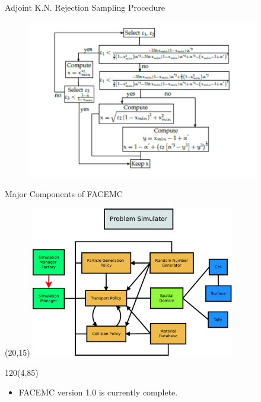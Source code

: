 \documentclass{beamer}
\begin{document}
\appendix
\begin{frame}{Adjoint K.N. Rejection Sampling Procedure}

  \begin{figure}[h!]
     \begin{center}
       \includegraphics[width=4in]{figures/adjoint_KN_rejection_sampling_proc.pdf}
     \end{center}
   \end{figure}

\end{frame}

\begin{frame}{Major Components of FACEMC}
  
  \begin{textblock}{20}(20,15)
    \includegraphics[width=3.5in]{../document/chapters/code_overview/Problem_Simulator.pdf}
  \end{textblock}

  \begin{textblock}{120}(4,85)
    \begin{itemize}
      \item FACEMC version 1.0 is currently complete.
    \end{itemize}
  \end{textblock}

\end{frame}
\end{document}
